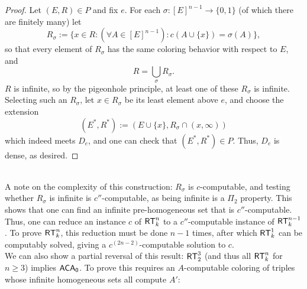 \documentclass{amsart}
\begin{document}
\begin{proof}
		Let $(E,R)\in P$ and fix $e$. For each $\sigma:[E]^{n-1}\to \{0,1\}$ (of which there are finitely many) let
		$$
		R_{\sigma} := \{x\in R : (\forall A\in [E]^{n-1}):c(A\cup \{x\}) = \sigma(A)\},
		$$
		so that every element of $R_{\sigma}$ has the same coloring behavior with respect to $E$, and
		$$
		R = \bigcup_{\sigma} R_{\sigma}.
		$$
		$R$ is infinite, so by the pigeonhole principle, at least one of these $R_{\sigma}$ is infinite. Selecting such an $R_{\sigma}$, let $x\in R_{\sigma}$ be its least element above $e$, and choose the extension
		$$
		(E^*,R^*) := (E\cup \{x\},R_{\sigma} \cap (x,\infty))
		$$
		which indeed meets $D_e$, and one can check that $(E^*,R^*)\in P$. Thus, $D_e$ is dense, as desired.
	\end{proof}\\
	
	A note on the complexity of this construction: $R_{\sigma}$ is $c$-computable, and testing whether $R_{\sigma}$ is infinite is $c''$-computable, as being infinite is a $\Pi_2$ property. This shows that one can find an infinite pre-homogeneous set that is $c''$-computable. Thus, one can reduce an instance $c$ of $\operatorname{\sf{RT}}^n_k$ to a $c''$-computable instance of $\operatorname{\sf{RT}}^{n-1}_k$. To prove $\operatorname{\sf{RT}}^n_k$, this reduction must be done $n-1$ times, after which $\operatorname{\sf{RT}}^1_k$ can be computably solved, giving a $c^{(2n-2)}$-computable solution to $c$.\\
	
	We can also show a partial reversal of this result: $\operatorname{\sf{RT}}^3_2$ (and thus all $\operatorname{\sf{RT}}^n_k$ for $n\geq 3$) implies $\operatorname{\sf{ACA_0}}$. To prove this requires an $A$-computable coloring of triples whose infinite homogeneous sets all compute $A'$:\\
	
\end{document}
